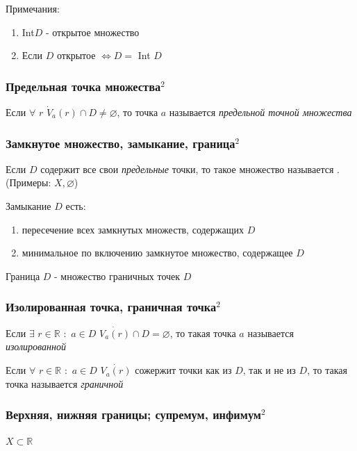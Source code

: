 \documentclass{article}
\def\dbl{\,\,}
\begin{document}
Примечания:
\begin{enumerate}
    \item Int$D$ - открытое множество
    \item Если $D$ открытое $\Leftrightarrow D = $ Int $D$
\end{enumerate}

\subsubsection{Предельная точка множества\texorpdfstring{$^2$}{}}
Если $\forall \dbl r \dbl \dot{V}_a(r) \cap D \ne \varnothing$, то точка $a$ называется \textit{предельной точной множества}

\subsubsection{Замкнутое множество, замыкание, граница\texorpdfstring{$^2$}{}}
Если $D$ содержит все свои \textit{предельные} точки, то такое множество  называется . (Примеры: $X, \varnothing$)

Замыкание $D$ есть: 
\begin{enumerate}
    \item пересечение всех замкнутых множеств, содержащих $D$
    \item минимальное по включению замкнутое множество, содержащее $D$
\end{enumerate}

Граница $D$ - множество граничных точек $D$

\subsubsection{Изолированная точка, граничная точка\texorpdfstring{$^2$}{}}
Если $\exists \dbl r \in \mathbb{R} \dbl : \dbl a \in D \dbl \dot{V_a(r)} \cap D = \varnothing$, то такая точка $a$ называется \textit{изолированной}

Если $\forall \dbl r \in \mathbb{R} \dbl : \dbl a \in D \dbl \dot{V_a(r)}$ сожержит точки как из $D$, так и не из $D$, то такая точка называется \textit{граничной}

\subsubsection{Верхняя, нижняя границы; супремум, инфимум\texorpdfstring{$^2$}{}}

$X \subset \mathbb{R}$
\end{document}
